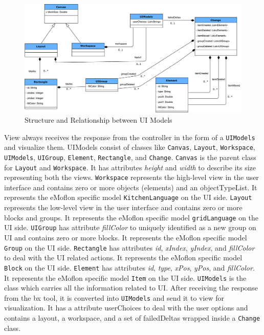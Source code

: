 \begin{figure}
	\includegraphics[width=1\textwidth]{figures/ClassDia_UI-Models}
	\caption{Structure and Relationship between UI Models}
	\label{fig:ClassDia_UI-Models}
\end{figure}

View always receives the response from the controller in the form of a \texttt{UIModels} and visualize them. UIModels consist of classes like \texttt{Canvas}, \texttt{Layout}, \texttt{Workspace}, \texttt{UIModels}, \texttt{UIGroup}, \texttt{Element}, \texttt{Rectangle}, and \texttt{Change}. \texttt{Canvas} is the parent class for \texttt{Layout} and \texttt{Workspace}. It has attributes \textit{height} and \textit{width} to describe its size representing both the views. \texttt{Workspace} represents the high-level view in the user interface and contains zero or more objects (elements) and an objectTypeList. It represents the eMoflon specific model \texttt{KitchenLanguage} on the UI side. \texttt{Layout} represents the low-level view in the user interface and contains zero or more blocks and groups. It represents the eMoflon specific model \texttt{gridLanguage} on the UI side.  \texttt{UIGroup} has attribute \textit{fillColor} to uniquely identified as a new group on UI and contains zero or more blocks. It represents the eMoflon specific model \texttt{Group} on the UI side. \texttt{Rectangle} has attributes \textit{id}, \textit{xIndex}, \textit{yIndex}, and \textit{fillColor} to deal with the UI related actions. It represents the eMoflon specific model \texttt{Block} on the UI side. \texttt{Element} has attributes \textit{id}, \textit{type}, \textit{xPos}, \textit{yPos}, and \textit{fillColor}. It represents the eMoflon specific model \texttt{Item} on the UI side. \texttt{UIModels} is the class which carries all the information related to UI. After receiving the response from the bx tool, it is converted into \texttt{UIModels} and send it to view for visualization. It has a attribute userChoices to deal with the user options and contains a layout, a workspace, and a set of failedDeltas wrapped inside a \texttt{Change} class.

